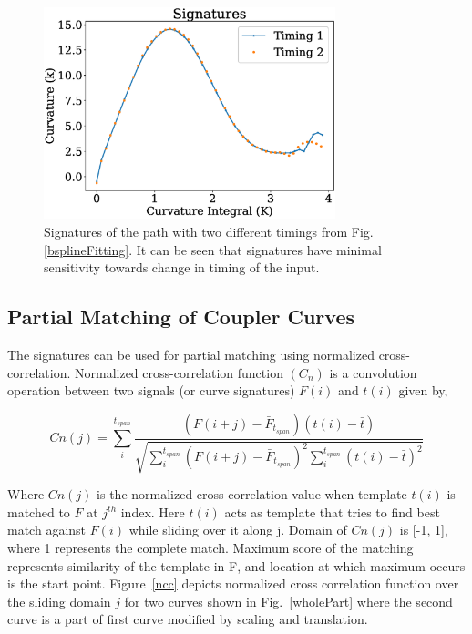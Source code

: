 \documentclass[twocolumn,10pt]{asme2ej}
\begin{document}
\begin{figure}
\centering
\includegraphics[width=240pt]{figure/fig_signatures.eps}
  \caption{Signatures of the path with two different timings from Fig.\ref{bsplineFitting}. It can be seen that signatures have minimal sensitivity towards change in timing of the input.}
\label{signature}
\end{figure}

\subsection{Partial Matching of Coupler Curves}\label{sec_ncc}
The signatures can be used for partial matching using normalized cross-correlation\cite{cui2009}.
Normalized cross-correlation function $(C_n)$ is a convolution operation between two signals (or curve signatures) $F(i)$ and $t(i)$ given by,

\begin{equation}
  Cn(j) = \sum_{i}^{t_{span}} \frac{(F(i+j) - \bar{F}_{t_{span}})(t(i) - \bar{t})}{\sqrt{\sum_{i}^{t_{span}}{(F(i+j) - \bar{F}_{t_{span}})}^2\sum_{i}^{t_{span}}{(t(i) - \bar{t})}^2}}
\end{equation}

Where $Cn(j)$ is the normalized cross-correlation value when template $t(i)$ is matched to $F$ at $j^{th}$ index. Here $t(i)$ acts as template that tries to find best match against $F(i)$ while sliding over it along j.
Domain of $Cn(j)$ is [-1, 1], where 1 represents the complete match.
Maximum score of the matching represents similarity of the template in F, and location at which maximum occurs is the start point.
Figure~\ref{ncc} depicts normalized cross correlation function over the sliding domain $j$ for two curves shown in Fig.~\ref{wholePart} where the second curve is a part of first curve modified by scaling and translation.
\end{document}
